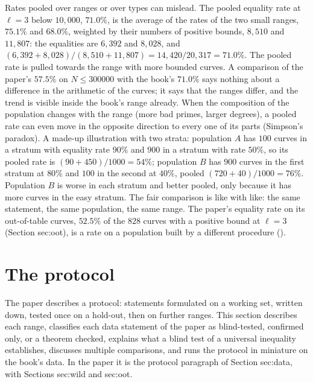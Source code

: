 \begin{sloppypar}
\begin{remark}[pooling]\label{rem:computation:simpson}
Rates pooled over ranges or over types can mislead. The pooled equality rate at $\ell=3$ below $10{,}000$, $71.0\%$, is the average of the rates of the
two small ranges, $75.1\%$ and $68.0\%$, weighted by their numbers of positive bounds, $8{,}510$ and $11{,}807$: the equalities are $6{,}392$ and $8{,}028$, and
$(6{,}392+8{,}028)/(8{,}510+11{,}807)=14{,}420/20{,}317=71.0\%$. The pooled rate is pulled towards the range with more bounded curves. A comparison of the paper's $57.5\%$ on
$N\le300000$ with the book's $71.0\%$ says nothing about a difference in the arithmetic of the curves; it says that the ranges differ, and the
trend is visible inside the book's range already. When the composition of the population changes with the range (more bad primes, larger
degrees), a pooled rate can even move in the opposite direction to every one of its parts (Simpson's paradox). A made-up illustration with
two strata: population $A$ has $100$ curves in a stratum with equality rate $90\%$ and $900$ in a stratum with rate $50\%$, so its pooled rate is
$(90+450)/1000=54\%$; population $B$ has $900$ curves in the first stratum at $80\%$ and $100$ in the second at $40\%$, pooled
$(720+40)/1000=76\%$. Population $B$ is worse in each stratum and better pooled, only because it has more curves in the easy stratum. The fair comparison is like with
like: the same statement, the same population, the same range. The paper's equality rate on its out-of-table curves, $52.5\%$ of the $828$
curves with a positive bound at $\ell=3$ (Section sec:oot), is a rate on a population built by a different procedure ().
\end{remark}

\section{The protocol}\label{sec:computation:protocol}

The paper describes a protocol: statements formulated on a working set, written down, tested once on a hold-out, then on further ranges. This
section describes each range, classifies each data statement of the paper as blind-tested, confirmed only, or a theorem checked, explains what
a blind test of a universal inequality establishes, discusses multiple comparisons, and runs the protocol in miniature on the book's data.
In the paper it is the protocol paragraph of Section sec:data, with Sections sec:wild and sec:oot.


\end{sloppypar}
